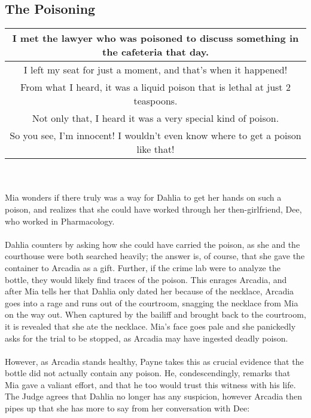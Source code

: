 \subsection{The Poisoning}
\begin{tabular}{c}
I met the lawyer who was poisoned to discuss something in the cafeteria that day.\\\hline
I left my seat for just a moment, and that's when it happened!\\\hline
From what I heard, it was a liquid poison that is lethal at just 2 teaspoons.\\\hline
Not only that, I heard it was a very special kind of poison.\\\hline
So you see, I'm innocent! I wouldn't even know where to get a poison like that!\\\hline
\end{tabular}\\
\\
Mia wonders if there truly was a way for Dahlia to get her hands on such a poison, and realizes that she could have worked through her then-girlfriend, Dee, who worked in Pharmacology. \\
\\
Dahlia counters by asking how she could have carried the poison, as she and the courthouse were both searched heavily; the answer is, of course, that she gave the container to Arcadia as a gift. Further, if the crime lab were to analyze the bottle, they would likely find traces of the poison. This enrages Arcadia, and after Mia tells her that Dahlia only dated her because of the necklace, Arcadia goes into a rage and runs out of the courtroom, snagging the necklace from Mia on the way out. When captured by the bailiff and brought back to the courtroom, it is revealed that she ate the necklace. Mia's face goes pale and she panickedly asks for the trial to be stopped, as Arcadia may have ingested deadly poison. \\
\\
However, as Arcadia stands healthy, Payne takes this as crucial evidence that the bottle did not actually contain any poison. He, condescendingly, remarks that Mia gave a valiant effort, and that he too would trust this witness with his life. The Judge agrees that Dahlia no longer has any suspicion, however Arcadia then pipes up that she has more to say from her conversation with Dee:\\
